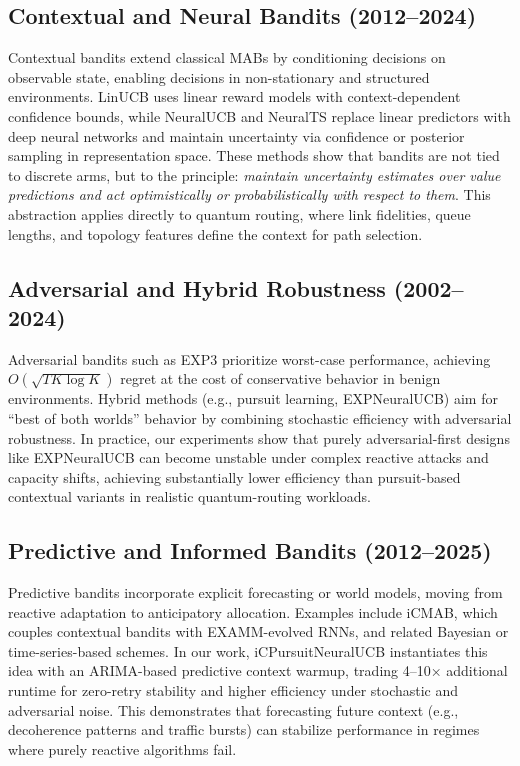 \documentclass[11pt,a4paper]{article}
\begin{document}
\subsection{Contextual and Neural Bandits (2012--2024)}

Contextual bandits extend classical MABs by conditioning decisions on observable state, enabling decisions in non-stationary and structured environments. LinUCB uses linear reward models with context-dependent confidence bounds, while NeuralUCB and NeuralTS replace linear predictors with deep neural networks and maintain uncertainty via confidence or posterior sampling in representation space. These methods show that bandits are not tied to discrete arms, but to the principle: \emph{maintain uncertainty estimates over value predictions and act optimistically or probabilistically with respect to them}. This abstraction applies directly to quantum routing, where link fidelities, queue lengths, and topology features define the context for path selection.

\subsection{Adversarial and Hybrid Robustness (2002--2024)}

Adversarial bandits such as EXP3 prioritize worst-case performance, achieving $O(\sqrt{T K \log K})$ regret at the cost of conservative behavior in benign environments. Hybrid methods (e.g., pursuit learning, EXPNeuralUCB) aim for ``best of both worlds'' behavior by combining stochastic efficiency with adversarial robustness. In practice, our experiments show that purely adversarial-first designs like EXPNeuralUCB can become unstable under complex reactive attacks and capacity shifts, achieving substantially lower efficiency than pursuit-based contextual variants in realistic quantum-routing workloads.

\subsection{Predictive and Informed Bandits (2012--2025)}

Predictive bandits incorporate explicit forecasting or world models, moving from reactive adaptation to anticipatory allocation. Examples include iCMAB, which couples contextual bandits with EXAMM-evolved RNNs, and related Bayesian or time-series-based schemes. In our work, iCPursuitNeuralUCB instantiates this idea with an ARIMA-based predictive context warmup, trading 4--10× additional runtime for zero-retry stability and higher efficiency under stochastic and adversarial noise. This demonstrates that forecasting future context (e.g., decoherence patterns and traffic bursts) can stabilize performance in regimes where purely reactive algorithms fail.
\end{document}
